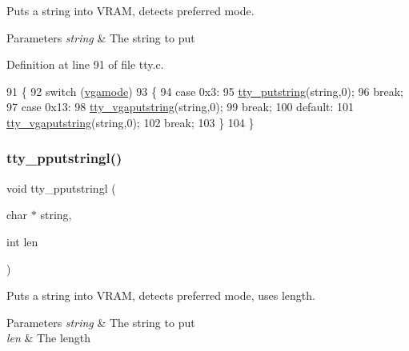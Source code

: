 Puts a string into V\+R\+AM, detects preferred mode. 


\begin{DoxyParams}{Parameters}
{\em string} & The string to put \\
\hline
\end{DoxyParams}


Definition at line 91 of file tty.\+c.


\begin{DoxyCode}
91                                   \{
92     \textcolor{keywordflow}{switch} (\hyperlink{a00053_af93b0649fdd1bea5b6d29ed37205aa2c_af93b0649fdd1bea5b6d29ed37205aa2c}{vgamode})
93     \{
94     \textcolor{keywordflow}{case} 0x3:
95         \hyperlink{a00149_a5b5bf610a57f3c59b2851fa2652081ec_a5b5bf610a57f3c59b2851fa2652081ec}{tty\_putstring}(\textcolor{keywordtype}{string},0);
96         \textcolor{keywordflow}{break};
97     \textcolor{keywordflow}{case} 0x13:
98         \hyperlink{a00149_a05ca3f5e64f38fec173b635ca8465415_a05ca3f5e64f38fec173b635ca8465415}{tty\_vgaputstring}(\textcolor{keywordtype}{string},0);
99         \textcolor{keywordflow}{break};
100     \textcolor{keywordflow}{default}:
101         \hyperlink{a00149_a05ca3f5e64f38fec173b635ca8465415_a05ca3f5e64f38fec173b635ca8465415}{tty\_vgaputstring}(\textcolor{keywordtype}{string},0);
102         \textcolor{keywordflow}{break};
103     \}
104 \}
\end{DoxyCode}
\mbox{\label{a00149_abaf93f9e56ddb7b10462070f59e534e4_abaf93f9e56ddb7b10462070f59e534e4}} 
\subsubsection{\texorpdfstring{tty\+\_\+pputstringl()}{tty\_pputstringl()}}
{\footnotesize\ttfamily void tty\+\_\+pputstringl (\begin{DoxyParamCaption}\item[{char $\ast$}]{string,  }\item[{int}]{len }\end{DoxyParamCaption})}



Puts a string into V\+R\+AM, detects preferred mode, uses length. 


\begin{DoxyParams}{Parameters}
{\em string} & The string to put \\
\hline
{\em len} & The length \\
\hline
\end{DoxyParams}


